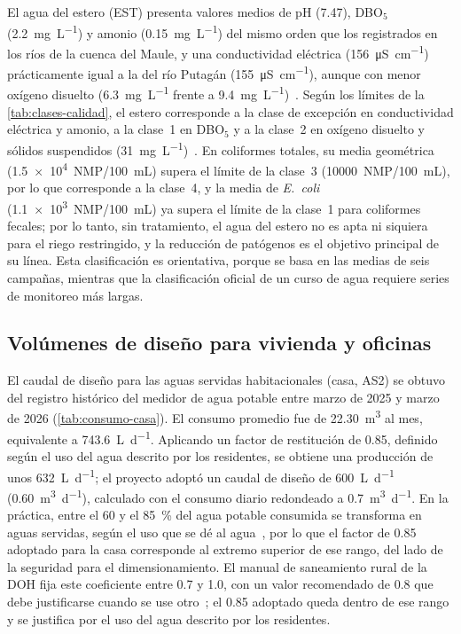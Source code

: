 El agua del estero (EST) presenta valores medios de pH (\num{7.47}), DBO$_5$ (\qty{2.2}{\milli\gram\per\liter}) y amonio (\qty{0.15}{\milli\gram\per\liter}) del mismo orden que los registrados en los ríos de la cuenca del Maule, y una conductividad eléctrica (\qty{156}{\micro\siemens\per\centi\meter}) prácticamente igual a la del río Putagán (\qty{155}{\micro\siemens\per\centi\meter}), aunque con menor oxígeno disuelto (\qty{6.3}{\milli\gram\per\liter} frente a \qty{9.4}{\milli\gram\per\liter})~\parencite{dga2004maule}.
Según los límites de la \cref{tab:clases-calidad}, el estero corresponde a la clase de excepción en conductividad eléctrica y amonio, a la clase~1 en DBO$_5$ y a la clase~2 en oxígeno disuelto y sólidos suspendidos (\qty{31}{\milli\gram\per\liter})~\parencite{dga2004volumen1}.
En coliformes totales, su media geométrica (\num{1.5e4}~NMP/\qty{100}{\milli\liter}) supera el límite de la clase~3 (\num{10000}~NMP/\qty{100}{\milli\liter}), por lo que corresponde a la clase~4, y la media de \textit{E.~coli} (\num{1.1e3}~NMP/\qty{100}{\milli\liter}) ya supera el límite de la clase~1 para coliformes fecales; por lo tanto, sin tratamiento, el agua del estero no es apta ni siquiera para el riego restringido, y la reducción de patógenos es el objetivo principal de su línea.
Esta clasificación es orientativa, porque se basa en las medias de seis campañas, mientras que la clasificación oficial de un curso de agua requiere series de monitoreo más largas.

\subsection{Volúmenes de diseño para vivienda y oficinas}

El caudal de diseño para las aguas servidas habitacionales (casa, AS2) se obtuvo del registro histórico del medidor de agua potable entre marzo de 2025 y marzo de 2026 (\cref{tab:consumo-casa}).
El consumo promedio fue de \qty{22.30}{\cubic\meter} al mes, equivalente a \qty{743.6}{\liter\per\day}.
Aplicando un factor de restitución de \num{0.85}, definido según el uso del agua descrito por los residentes, se obtiene una producción de unos \qty{632}{\liter\per\day}; el proyecto adoptó un caudal de diseño de \qty{600}{\liter\per\day} (\qty{0.60}{\cubic\meter\per\day}), calculado con el consumo diario redondeado a \qty{0.7}{\cubic\meter\per\day}.
En la práctica, entre el 60 y el \qty{85}{\percent} del agua potable consumida se transforma en aguas servidas, según el uso que se dé al agua~\parencite{vidal2023desarrollo}, por lo que el factor de \num{0.85} adoptado para la casa corresponde al extremo superior de ese rango, del lado de la seguridad para el dimensionamiento.
El manual de saneamiento rural de la DOH fija este coeficiente entre \num{0.7} y \num{1.0}, con un valor recomendado de \num{0.8} que debe justificarse cuando se use otro~\parencite{doh2023manual}; el \num{0.85} adoptado queda dentro de ese rango y se justifica por el uso del agua descrito por los residentes.

